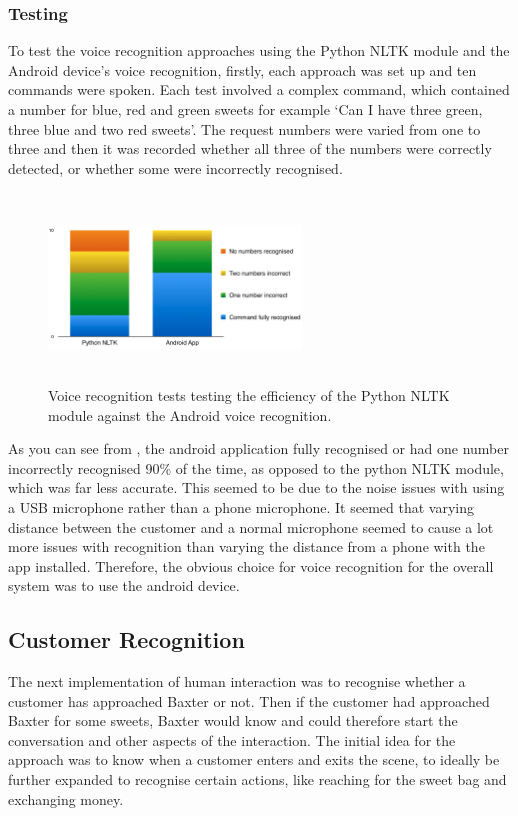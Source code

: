 \subsubsection{Testing}
To test the voice recognition approaches using the Python NLTK module and the Android device's voice recognition, firstly, each approach was set up and ten commands were spoken. Each test involved a complex command, which contained a number for blue, red and green sweets for example `Can I have three green, three blue and two red sweets'. The request numbers were varied from one to three and then it was recorded whether all three of the numbers were correctly detected, or whether some were incorrectly recognised.
\captionsetup[figure]{justification=centering}
\begin{figure}[H]
        \centering 
        \includegraphics[width=0.6\textwidth, height=5cm]{voicerecognitiontests.png}
        \caption{Voice recognition tests testing the efficiency of the Python NLTK module against the Android voice recognition.}
         \label{fig:voicetests}
\end{figure}
As you can see from \textbf{}, the android application fully recognised or had one number incorrectly recognised 90\% of the time, as opposed to the python NLTK module, which was far less accurate. This seemed to be due to the noise issues with using a USB microphone rather than a phone microphone. It seemed that varying distance between the customer and a normal microphone seemed to cause a lot more issues with recognition than varying the distance from a phone with the app installed. Therefore, the obvious choice for voice recognition for the overall system was to use the android device.
\subsection{Customer Recognition}
The next implementation of human interaction was to recognise whether a customer has approached Baxter or not. Then if the customer had approached Baxter for some sweets, Baxter would know and could therefore start the conversation and other aspects of the interaction. The initial idea for the approach was to know when a customer enters and exits the scene, to ideally be further expanded to recognise certain actions, like reaching for the sweet bag and exchanging money.
